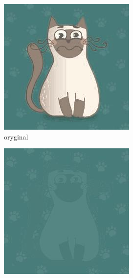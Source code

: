 \documentclass[12pt,a4paper]{article}
\begin{document}
    \begin{figure}[htb]
    \centering %
\begin{subfigure}{0.25\textwidth}
  \includegraphics[width=\linewidth]{images/cartoon/original}
  \caption{oryginal}
  \label{fig:1}
\end{subfigure}\hfil %
\begin{subfigure}{0.25\textwidth}
  \includegraphics[width=\linewidth]{images/cartoon/3-3-5-05}

\end{subfigure}
\end{figure}
\end{document}
